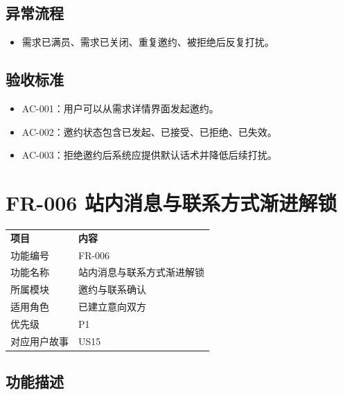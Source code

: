 \subsection{异常流程}\label{ux5f02ux5e38ux6d41ux7a0b-4}

\begin{itemize}
\item
  需求已满员、需求已关闭、重复邀约、被拒绝后反复打扰。
\end{itemize}

\subsection{验收标准}\label{ux9a8cux6536ux6807ux51c6-4}

\begin{itemize}
\item
  AC-001：用户可以从需求详情界面发起邀约。
\item
  AC-002：邀约状态包含已发起、已接受、已拒绝、已失效。
\item
  AC-003：拒绝邀约后系统应提供默认话术并降低后续打扰。
\end{itemize}

\section{FR-006
站内消息与联系方式渐进解锁}\label{fr-006-ux7ad9ux5185ux6d88ux606fux4e0eux8054ux7cfbux65b9ux5f0fux6e10ux8fdbux89e3ux9501}

{\def\LTcaptype{none} %
\begin{xltabular}{\textwidth}{@{}>{\centering\arraybackslash}X>{\centering\arraybackslash}X@{}}
\toprule\noalign{}
\endhead
\bottomrule\noalign{}
\endlastfoot
\textbf{项目} & \textbf{内容} \\
功能编号 & FR-006 \\
功能名称 & 站内消息与联系方式渐进解锁 \\
所属模块 & 邀约与联系确认 \\
适用角色 & 已建立意向双方 \\
优先级 & P1 \\
对应用户故事 & US15 \\
\end{xltabular}
}

\subsection{功能描述}\label{ux529fux80fdux63cfux8ff0-5}

